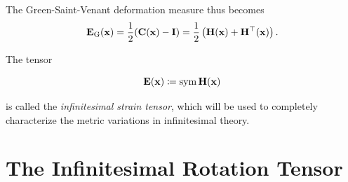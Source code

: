The Green-Saint-Venant deformation measure thus becomes
\begin{equation}
	\mathbf{E}_{\rm G}(\mathbf{x})=\frac{1}{2}(\mathbf{C}(\mathbf{x})-\mathbf{I})=\frac{1}{2}\left(\mathbf{H(x)+H^\top(x)}\right).
\end{equation}

The tensor
\begin{definition}
	\begin{equation}\label{simgrad}
		\mathbf{E}(\mathbf{x})\coloneqq\operatorname{sym} \mathbf{H}(\mathbf{x})
	\end{equation}
\end{definition}
is called the \textit{infinitesimal strain tensor}, which will be used to completely characterize the metric variations in infinitesimal theory.

\section{The Infinitesimal Rotation Tensor}

